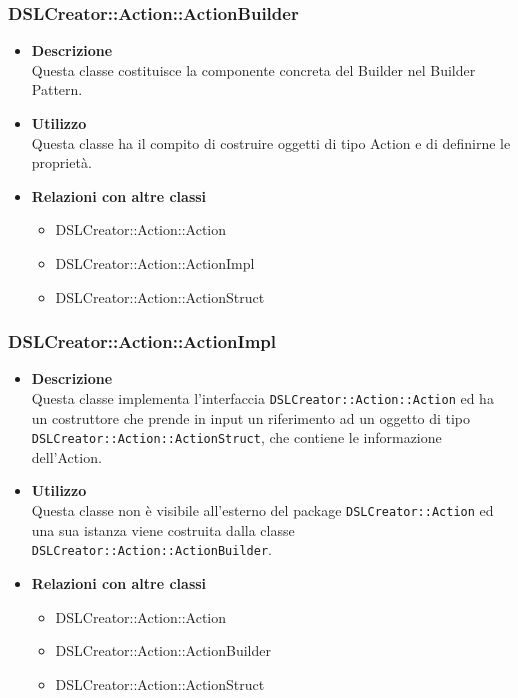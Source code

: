  \subsubsection{DSLCreator::Action::ActionBuilder}
                    \begin{itemize}
                        \item \textbf{Descrizione} \hfill \\
                          Questa classe costituisce la componente concreta del Builder nel Builder Pattern.
                        \item \textbf{Utilizzo} \hfill \\
                          Questa classe ha il compito di costruire oggetti di tipo Action e di definirne le proprietà.
                        \item \textbf{Relazioni con altre classi}
                            \begin{itemize}
                              \item DSLCreator::Action::Action
                              \item DSLCreator::Action::ActionImpl
                              \item DSLCreator::Action::ActionStruct
                            \end{itemize}
                    \end{itemize}  

 \subsubsection{DSLCreator::Action::ActionImpl}
                    \begin{itemize}
                        \item \textbf{Descrizione} \hfill \\
                          Questa classe implementa l'interfaccia \texttt{DSLCreator::Action::Action} ed ha un costruttore che prende in input un riferimento ad un oggetto di tipo \texttt{DSLCrea\-tor::Action::ActionStruct}, che contiene le informazione dell'Action.
                        \item \textbf{Utilizzo} \hfill \\
                          Questa classe non è visibile all'esterno del package \texttt{DSLCreator::Action} ed una sua istanza viene costruita dalla classe \texttt{DSLCreator::Action::ActionBuilder}.
                        \item \textbf{Relazioni con altre classi}
                            \begin{itemize}
                              \item DSLCreator::Action::Action
                              \item DSLCreator::Action::ActionBuilder
                              \item DSLCreator::Action::ActionStruct
                            \end{itemize}
                    \end{itemize}  

